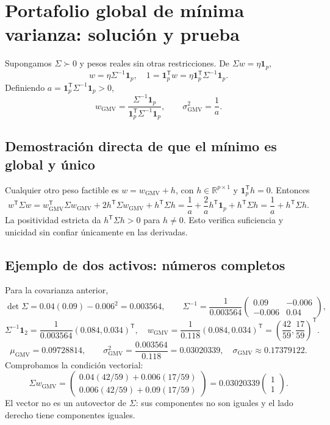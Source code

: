\documentclass[11pt,a4paper]{article}
\newcommand{\R}{\mathbb R}
\newcommand{\T}{^{\mathsf T}}
\newcommand{\ones}{\mathbf 1}
\theoremstyle{definition}
\begin{document}
\section{Portafolio global de mínima varianza: solución y prueba}
Supongamos $\Sigma\succ0$ y pesos reales sin otras restricciones. De $\Sigma w=\eta\ones_p$,
\[
w=\eta\Sigma^{-1}\ones_p,\quad1=\ones_p\T w=\eta\ones_p\T\Sigma^{-1}\ones_p.
\]
Definiendo $a=\ones_p\T\Sigma^{-1}\ones_p>0$,
\[
\boxed{w_{\mathrm{GMV}}=\frac{\Sigma^{-1}\ones_p}{\ones_p\T\Sigma^{-1}\ones_p}},\qquad
\boxed{\sigma_{\mathrm{GMV}}^2=\frac1a}.
\]
\subsection{Demostración directa de que el mínimo es global y único}
Cualquier otro peso factible es $w=w_{\mathrm{GMV}}+h$, con $h\in\R^{p\times1}$ y $\ones_p\T h=0$. Entonces
\[
w\T\Sigma w=w_{\mathrm{GMV}}\T\Sigma w_{\mathrm{GMV}}+2h\T\Sigma w_{\mathrm{GMV}}+h\T\Sigma h
=\frac1a+\frac2a h\T\ones_p+h\T\Sigma h=\frac1a+h\T\Sigma h.
\]
La positividad estricta da $h\T\Sigma h>0$ para $h\ne0$. Esto verifica suficiencia y unicidad sin confiar únicamente en las derivadas.
\subsection{Ejemplo de dos activos: números completos}
Para la covarianza anterior,
\[
\det\Sigma=0.04(0.09)-0.006^2=0.003564,\qquad
\Sigma^{-1}=\frac1{0.003564}\begin{pmatrix}0.09&-0.006\\-0.006&0.04\end{pmatrix},
\]
\[
\Sigma^{-1}\ones_2=\frac1{0.003564}(0.084,0.034)\T,\quad
w_{\mathrm{GMV}}=\frac1{0.118}(0.084,0.034)\T
=\left(\frac{42}{59},\frac{17}{59}\right)\T.
\]
\[
\mu_{\mathrm{GMV}}=0.09728814,\qquad
\sigma_{\mathrm{GMV}}^2=\frac{0.003564}{0.118}=0.03020339,\quad
\sigma_{\mathrm{GMV}}\approx0.17379122.
\]
Comprobamos la condición vectorial:
\[
\Sigma w_{\mathrm{GMV}}
=\begin{pmatrix}0.04(42/59)+0.006(17/59)\\0.006(42/59)+0.09(17/59)\end{pmatrix}
=0.03020339\begin{pmatrix}1\\1\end{pmatrix}.
\]
El vector no es un autovector de $\Sigma$: sus componentes no son iguales y el lado derecho tiene componentes iguales.
\end{document}
